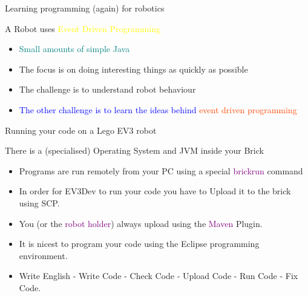 \documentclass[color=pdftex,usenames,dvipsnames, aspectratio=169]{beamer}
\begin{document}
\begin{frame}{Learning programming (again) for robotics}

\begin{block}{A Robot uses \textcolor{yellow}{Event Driven Programming}}
\begin{itemize}
  \item \textcolor{teal}{Small amounts of simple Java}
  \item \textcolor{OliveGreen}{The focus is on doing interesting things as quickly as possible}
  \item \textcolor{RedOrange}{The challenge is to understand robot behaviour}
  \item \textcolor{blue}{The other challenge is to learn the ideas behind \textcolor{OrangeRed}{event driven programming}}
\end{itemize}
\end{block}
\end{frame}


\begin{frame}{Running your code on a Lego EV3 robot}
\begin{block}{There is a (specialised) Operating System and JVM inside your Brick}
\begin{itemize}
\item Programs are run remotely from your PC using a special \textcolor{purple}{brickrun} command
\item In order for EV3Dev to run your code you have to \alert{Upload} it to the brick using SCP.
\item You (or the \textcolor{purple}{robot holder}) always upload using the \textcolor{purple}{Maven} Plugin.
\item It is nicest to program your code using the \textcolor{OliveGreen}{Eclipse} programming environment. 
\item Write English - Write Code - Check Code - Upload Code - Run Code - Fix Code.
\end{itemize}
\end{block}

\end{frame}

\end{document}
